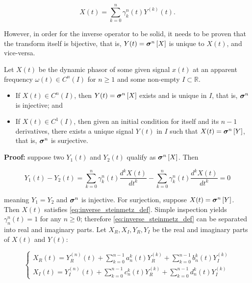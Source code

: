 \begin{equation} X(t) = \sum_{k=0}^n \gamma_k^n (t) Y^{(k)}(t). \label{eq:inverse_steinmetz_def} \end{equation}

	However, in order for the inverse operator to be solid, it needs to be proven that the transform itself is bijective, that is, $Y(t) = \boldsymbol{\sigma}^{n} \left[X\right]$ is unique to $X(t)$, and vice-versa.

\begin{theorem} \label{theo:bijection} %
	Let $X(t)$ be the dynamic phasor of some given signal $x(t)$ at an apparent frequency $\omega(t)\in C^n\left(I\right)$ for $n\geq 1$ and some non-empty $I\subset\mathbb{R}$.

\begin{itemize}
	\item If $X(t)\in C^n\left(I\right)$, then $Y(t) = \boldsymbol{\sigma}^{n} \left[X\right]$ exists and is unique in $I$, that is, $\boldsymbol{\sigma}^{n}$ is injective; and
	\item If $X(t)\in C^1\left(I\right)$, then given an initial condition for itself and its $n-1$ derivatives, there exists a unique signal $Y(t)$ in $I$ such that $X(t) = \boldsymbol{\sigma}^{n} \left[Y\right]$, that is, $\boldsymbol{\sigma}^{n}$ is surjective.
\end{itemize}

\end{theorem}
\noindent\textbf{Proof:} suppose two $Y_1(t)$ and $Y_2(t)$ qualify as $\boldsymbol{\sigma}^{n} \left[X\right]$. Then 

\begin{equation} Y_1(t) - Y_2(t) = \sum_{k=0}^n \gamma_k^n (t) \dfrac{d^kX(t)}{dt^k} - \sum_{k=0}^n \gamma_k^n (t) \dfrac{d^kX(t)}{dt^k} = 0\end{equation}

	\noindent meaning $Y_1 = Y_2$ and $\boldsymbol{\sigma}^{n}$ is injective. For surjection, suppose $X(t) = \boldsymbol{\sigma}^{n} \left[Y\right]$. Then $X(t)$ satisfies \eqref{eq:inverse_steinmetz_def}. Simple inspection yields $\gamma_n^n(t) = 1$ for any $n \geq 0$; therefore \eqref{eq:inverse_steinmetz_def} can be separated into real and imaginary parts. Let $X_R,X_I,Y_R,Y_I$ be the real and imaginary parts of $X(t)$ and $Y(t)$:

\begin{equation} \left\{\begin{array}{l} \displaystyle X_R(t) = Y_R^{(n)}(t) + \sum_{k=0}^{n-1} a_n^k\left(t\right)Y_R^{(k)} + \sum_{k=0}^{n-1} b_n^k\left(t\right)Y_I^{(k)} \\[5mm] \displaystyle X_I(t) = Y_I^{(n)}(t) + \sum_{k=0}^{n-1} c_n^k\left(t\right)Y_R^{(k)} + \sum_{k=0}^{n-1} d_n^k\left(t\right)Y_I^{(k)} \end{array}\right. \label{eq:theo_bijection_reimsys} \end{equation}

